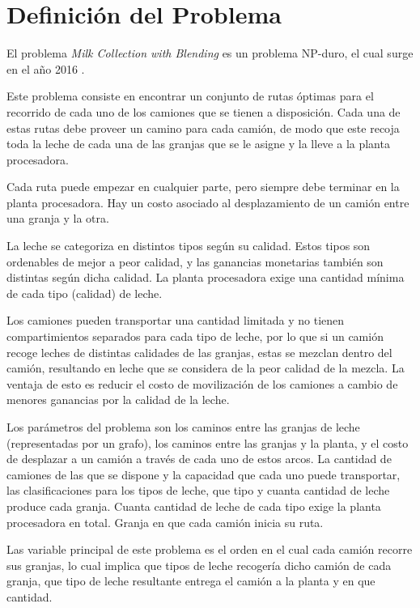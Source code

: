 \section{Definición del Problema}

El problema \textit{Milk Collection with Blending} es un problema NP-duro, el cual surge en el año 2016 \cite{MilkWithBlending}.

Este problema consiste en encontrar un conjunto de rutas óptimas para el recorrido de cada uno de los camiones que se tienen a disposición. Cada una de estas rutas debe proveer un camino para cada camión, de modo que este recoja toda la leche de cada una de las granjas que se le asigne y la lleve a la planta procesadora.

Cada ruta puede empezar en cualquier parte, pero siempre debe terminar en la planta procesadora. Hay un costo asociado al desplazamiento de un camión entre una granja y la otra.

La leche se categoriza en distintos tipos según su calidad. Estos tipos son ordenables de mejor a peor calidad, y las ganancias monetarias también son distintas según dicha calidad.
La planta procesadora exige una cantidad mínima de cada tipo (calidad) de leche.

Los camiones pueden transportar una cantidad limitada y no tienen compartimientos separados para cada tipo de leche, por lo que si un camión recoge leches de distintas calidades de las granjas, estas se mezclan dentro del camión, resultando en leche que se considera de la peor calidad de la mezcla. La ventaja de esto es reducir el costo de movilización de los camiones a cambio de menores ganancias por la calidad de la leche.

Los parámetros del problema son los caminos entre las granjas de leche (representadas por un grafo), los caminos entre las granjas y la planta, y el costo de desplazar a un camión a través de cada uno de estos arcos. La cantidad de camiones de las que se dispone y la capacidad que cada uno puede transportar, las clasificaciones para los tipos de leche, que tipo y cuanta cantidad de leche produce cada granja. Cuanta cantidad de leche de cada tipo exige la planta procesadora en total. Granja en que cada camión inicia su ruta.

Las variable principal de este problema es el orden en el cual cada camión recorre sus granjas, lo cual implica que tipos de leche recogería dicho camión de cada granja, que tipo de leche resultante entrega el camión a la planta y en que cantidad.

